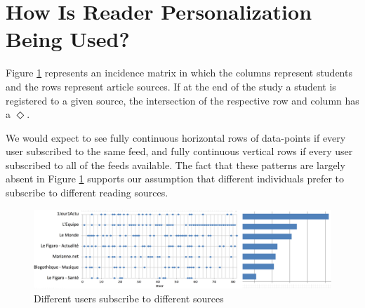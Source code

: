 
\section{How Is Reader Personalization Being Used?}
\label{sec:results}


Figure \ref{fig:subscriptions} represents an incidence matrix in which the columns represent students and the rows represent article sources. If at the end of the study a student is registered to a given source, the intersection of the respective row and column has a $\Diamond$. 

We would expect to see fully continuous horizontal rows of data-points if every user subscribed to the same feed, and fully continuous vertical rows if every user subscribed to all of the feeds available. The fact that these patterns are largely absent in Figure \ref{fig:subscriptions} supports our assumption that different individuals prefer to subscribe to different reading sources.


\begin{figure}[h!]

\centering
  \includegraphics[width=\columnwidth]{figures/users_feeds_histo}
  \caption{Different users subscribe to different sources}
  \label{fig:subscriptions}  
\end{figure}

